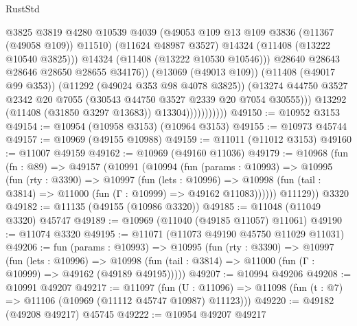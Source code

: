 \begin{lexlean}{RustStd}
\begin{coremodule}
                                    @3825
                                    @3819
                                    @4280
                                    @10539
                                    @4039
                                    (@49053 @109 @13 @109 @3836 (@11367 (@49058 @109)) @11510)
                                    (@11624 @48987 @3527)
                                    @14324
                                    (@11408 (@13222 @10540 @3825)))
                                  @14324
                                  (@11408 (@13222 @10530 @10546)))
                                @28640
                                @28643
                                @28646
                                @28650
                                @28655
                                @34176))
                            (@13069 (@49013 @109))
                            (@11408 (@49017 @99 @353))
                            (@11292 (@49024 @353 @98 @4078 @3825))
                            (@13274
                              @44750
                              @3527
                              @2342
                              @20
                              @7055
                              (@30543 @44750 @3527 @2339 @20 @7054 @30555)))
                          @13292
                          (@11408 (@31850 @3297 @13683))
                          @13304)))))))))))
@49150 := @10952 @3153
@49154 := @10954 (@10958 @3153) (@10964 @3153)
@49155 := @10973 @45744
@49157 := @10969 (@49155 @10988)
@49159 := @11011 (@11012 @3153)
@49160 := @11007 @49159
@49162 := @10969 (@49160 @11036)
@49179 := @10968
    (fun (fn : @89) =>
    @49157
      (@10991
        (@10994
          (fun (params : @10993) =>
          @10995
            (fun (rty : @3390) =>
            @10997
              (fun (lets : @10996) =>
              @10998 (fun (tail : @3814) => @11000 (fun (Γ : @10999) => @49162 @11083))))))
        @11129))
    @3320
@49182 := @11135 (@49155 (@10986 @3320))
@49185 := @11048 (@11049 @3320) @45747
@49189 := @10969 (@11040 (@49185 @11057) @11061)
@49190 := @11074 @3320
@49195 := @11071 (@11073 @49190 @45750 @11029 @11031)
@49206 := fun (params : @10993) =>
  @10995
    (fun (rty : @3390) =>
    @10997
      (fun (lets : @10996) =>
      @10998 (fun (tail : @3814) => @11000 (fun (Γ : @10999) => @49162 (@49189 @49195)))))
@49207 := @10994 @49206
@49208 := @10991 @49207
@49217 := @11097
    (fun (U : @11096) => @11098 (fun (t : @7) => @11106 (@10969 (@11112 @45747 @10987) @11123)))
@49220 := @49182 (@49208 @49217) @45745
@49222 := @10954 @49207 @49217

\end{coremodule}
\end{lexlean}
